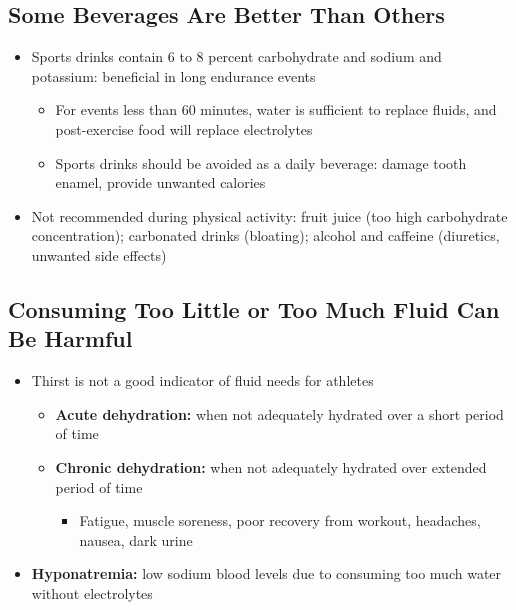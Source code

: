 \documentclass[12pt]{article}
\begin{document}
        \subsection{Some Beverages Are Better Than Others}
            \begin{itemize}
                \item Sports drinks contain 6 to 8 percent carbohydrate and sodium and potassium: beneficial in long endurance events
                    \begin{itemize}
                        \item For events less than 60 minutes, water is sufficient to replace fluids, and post-exercise food will replace electrolytes
                        \item Sports drinks should be avoided as a daily beverage: damage tooth enamel, provide unwanted calories
                    \end{itemize}
                \item Not recommended during physical activity: fruit juice (too high carbohydrate concentration); carbonated drinks (bloating); alcohol and caffeine (diuretics, unwanted side effects)
            \end{itemize}

        \subsection{Consuming Too Little or Too Much Fluid Can Be Harmful}
            \begin{itemize}
                \item Thirst is not a good indicator of fluid needs for athletes
                    \begin{itemize}
                        \item \textbf{Acute dehydration:} when not adequately hydrated over a short period of time
                        \item \textbf{Chronic dehydration:} when not adequately hydrated over extended period of time
                            \begin{itemize}
                                \item Fatigue, muscle soreness, poor recovery from workout, headaches, nausea, dark urine
                            \end{itemize}
                    \end{itemize}
                \item \textbf{Hyponatremia:} low sodium blood levels due to consuming too much water without electrolytes
            \end{itemize}
\end{document}
